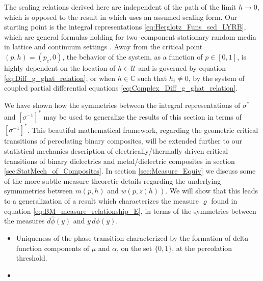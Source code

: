 \documentclass[english,12pt,jmp,graphicx]{revtex4-1}
\newcommand{\ph}{\hat{\phi}}
\begin{document}
The scaling relations derived here are independent of the path of the
limit $h\to0$, which is opposed to the result in \cite{Efros:PSSB-303}
which uses an assumed scaling form. Our starting point is the integral
representations \eqref{eq:Herglotz_Funs_sed_LYRB}, which are general
formulas holding for two--component stationary random media in lattice
and continuum settings \cite{Golden:PRL-3935}. Away from the critical
point $(p,h)=(p_c,0)$, the behavior of the system, as a function of
$p\in[0,1]$, is highly dependent on the location of $h\in\mathcal{U}$ and
is governed by equation \eqref{eq:Diff_g_ghat_relation}, or when
$h\in\mathbb{C}$ such that $h_i\neq0$, by the system of coupled partial
differential equations \eqref{eq:Complex_Diff_g_ghat_relation}.  

We have shown how the symmetries between the 
integral representations of $\sigma^*$ and $[\sigma^{-1}]^*$ may be used to
generalize the results of this section in terms of
$[\sigma^{-1}]^*$. This beautiful mathematical framework, regarding the
geometric critical transitions of percolating binary composites, will
be extended further to our statistical mechanics description of
electrically/thermally driven critical transitions of binary
dielectrics and metal/dielectric composites in section
\ref{sec:StatMech_of_Composites}. In section \ref{sec:Measure_Equiv}
we discuss some of the more subtle measure theoretic details regarding
the underlying symmmetries between $m(p,h)$ and $w(p,z(h))$. We will
show that this leads to a generalization of a result
\cite{Day:JPCM-96} which characterizes the measure $\varrho$ found in
equation \eqref{eq:BM_measure_relationship_E}, in terms of the
symmetries between the measures $d\ph(y)$ and $y\,d\phi(y)$.   

\begin{itemize}
\item Uniqueness of the phase transition characterized by the
  formation of delta function components of $\mu$ and $\alpha$, on the set
  $\{0,1\}$, at the percolation threshold.
\item
\end{itemize}




\end{document}
